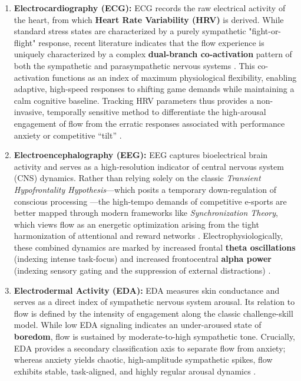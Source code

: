 \begin{enumerate}
    \item \textbf{Electrocardiography (ECG):} ECG records the raw electrical activity of the heart, from which \textbf{Heart Rate Variability (HRV)} is derived. While standard stress states are characterized by a purely sympathetic "fight-or-flight" response, recent literature indicates that the flow experience is uniquely characterized by a complex \textbf{dual-branch co-activation} pattern of both the sympathetic and parasympathetic nervous systems \autocite{uechtritz2026neurophysiological}. This co-activation functions as an index of maximum physiological flexibility, enabling adaptive, high-speed responses to shifting game demands while maintaining a calm cognitive baseline. Tracking HRV parameters thus provides a non-invasive, temporally sensitive method to differentiate the high-arousal engagement of flow from the erratic responses associated with performance anxiety or competitive \enquote{tilt} \autocite{irshad2023wearable}.
    
    \item \textbf{Electroencephalography (EEG):} EEG captures bioelectrical brain activity and serves as a high-resolution indicator of central nervous system (CNS) dynamics. Rather than relying solely on the classic \textit{Transient Hypofrontality Hypothesis}—which posits a temporary down-regulation of conscious processing \autocite{dietrich2004neurocognitive}—the high-tempo demands of competitive e-sports are better mapped through modern frameworks like \textit{Synchronization Theory}, which views flow as an energetic optimization arising from the tight harmonization of attentional and reward networks \autocite{uechtritz2026neurophysiological}. Electrophysiologically, these combined dynamics are marked by increased frontal \textbf{theta oscillations} (indexing intense task-focus) and increased frontocentral \textbf{alpha power} (indexing sensory gating and the suppression of external distractions) \autocite{katahira2018eeg}.

    \item \textbf{Electrodermal Activity (EDA):} EDA measures skin conductance and serves as a direct index of sympathetic nervous system arousal. Its relation to flow is defined by the intensity of engagement along the classic challenge-skill model. While low EDA signaling indicates an under-aroused state of \textbf{boredom}, flow is sustained by moderate-to-high sympathetic tone. Crucially, EDA provides a secondary classification axis to separate flow from anxiety; whereas anxiety yields chaotic, high-amplitude sympathetic spikes, flow exhibits stable, task-aligned, and highly regular arousal dynamics \autocite{irshad2023wearable}.
\end{enumerate}

